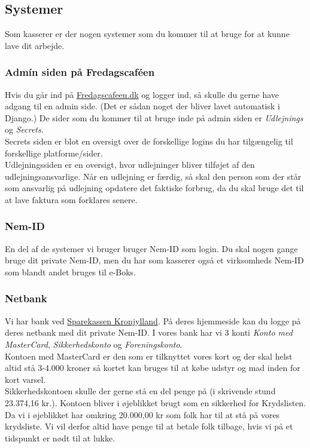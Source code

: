 \subsection{Systemer}
Som kasserer er der nogen systemer som du kommer til at bruge for at kunne lave dit arbejde.
\subsubsection{Admín siden på Fredagscaféen}
Hvis du går ind på \href{https://Fredagscafeen.dk}{Fredagscafeen.dk} og logger ind, så skulle du gerne have adgang til en admin side. (Det er sådan noget der bliver lavet automatisk i Django.) De sider som du kommer til at bruge inde på admin siden er \textit{Udlejnings} og \textit{Secrets}.\\
Secrets siden er blot en oversigt over de forskellige logins du har tilgængelig til forskellige platforme/sider.\\
Udlejningssiden er en oversigt, hvor udlejninger bliver tilføjet af den udlejningsansvarlige. Når en udlejning er færdig, så skal den person som der står som ansvarlig på udlejning opdatere det faktiske forbrug, da du skal bruge det til at lave faktura som forklares senere.
\subsubsection{Nem-ID}
En del af de systemer vi bruger bruger Nem-ID som login. Du skal nogen gange bruge dit private Nem-ID, men du har som kasserer også et virksomheds Nem-ID som blandt andet bruges til e-Boks.
\subsubsection{Netbank}
Vi har bank ved \href{https://www.sparkron.dk/}{Sparekassen Kronjylland}. På deres hjemmeside kan du logge på deres netbank med dit private Nem-ID. I vores bank har vi 3 konti \textit{Konto med MasterCard}, \textit{Sikkerhedskonto} og \textit{Foreningskonto}.\\ Kontoen med MasterCard er den som er tilknyttet vores kort og der skal helst altid stå 3-4.000 kroner så kortet kan bruges til at købe udstyr og mad inden for kort varsel.\\
Sikkerhedskontoen skulle der gerne stå en del penge på (i skrivende stund 23.374,16 kr.). Kontoen bliver i øjeblikket brugt som en sikkerhed for Krydslisten. Da vi i øjeblikket har omkring 20.000,00 kr som folk har til at stå på vores krydsliste. Vi vil derfor altid have penge til at betale folk tilbage, hvis vi på et tidspunkt er nødt til at lukke.\\
